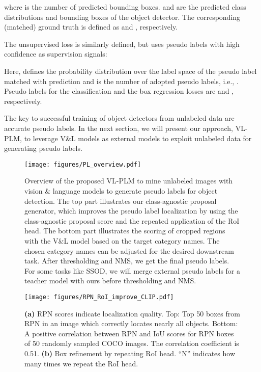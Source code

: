 \documentclass[runningheads]{llncs}
\begin{document}
where  is the number of predicted bounding boxes.   and  are the predicted class distributions and bounding boxes of the object detector. The corresponding (matched) ground truth is defined as  and , respectively.

The unsupervised loss  is similarly defined, but uses pseudo labels with high confidence as supervision signals:

Here,  defines the probability distribution over the label space of the pseudo label matched with prediction  and  is the number of adopted pseudo labels, i.e., . 
Pseudo labels for the classification and the box regression losses are  and , respectively.

The key to successful training of object detectors from unlabeled data are accurate pseudo labels.  In the next section, we will present our approach, VL-PLM, to leverage V\&L models as external models to exploit unlabeled data for generating pseudo labels.


\begin{figure}[t]\centering
    \texttt{[image: figures/PL\_overview.pdf]}
\caption{
    Overview of the proposed VL-PLM to mine unlabeled images with vision \& language models to generate pseudo labels for object detection.  The top part illustrates our class-agnostic proposal generator, which improves the pseudo label localization by using the class-agnostic proposal score and the repeated application of the RoI head.  The bottom part illustrates the scoring of cropped regions with the V\&L model based on the target category names.  The chosen category names can be adjusted for the desired downstream task.  After thresholding and NMS, we get the final pseudo labels.  For some tasks like SSOD, we will merge external pseudo labels for a teacher model with ours before thresholding and NMS.
    }
    \label{fig:overview_pipeline}
\end{figure}

\begin{figure}[t]\centering
    \texttt{[image: figures/RPN\_RoI\_improve\_CLIP.pdf]}
\caption{\textbf{(a)} RPN scores indicate localization quality. Top: Top 50 boxes from RPN in an image which correctly locates nearly all objects. Bottom: A positive correlation between RPN and IoU scores for RPN boxes of 50 randomly sampled COCO images. The correlation coefficient is 0.51.
    \textbf{(b)} Box refinement by repeating RoI head. ``N'' indicates how many times we repeat the RoI head.}
    \label{fig:method_localization}
\end{figure}
\end{document}
